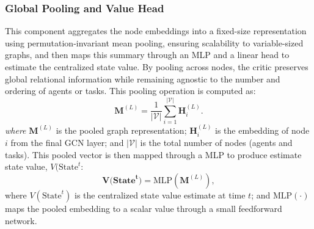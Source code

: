 \subsubsection{\textbf{Global Pooling and Value Head}} \label{critic_valuehead}
This component aggregates the node embeddings into a fixed-size representation using permutation-invariant mean pooling, ensuring scalability to variable-sized graphs, and then maps this summary through an MLP and a linear head to estimate the centralized state value. By pooling across nodes, the critic preserves global relational information while remaining agnostic to the number and ordering of agents or tasks. This pooling operation is computed as:
\begin{equation}
\mathbf{M}^{(L)} = \frac{1}{|\mathcal{V}|} \sum_{i=1}^{|\mathcal{V}|} \mathbf{H}^{(L)}_i.
\end{equation}
\noindent\textit{where} \(\mathbf{M}^{(L)}\) is the pooled graph representation;
\(\mathbf{H}^{(L)}_i\) is the embedding of node \(i\) from the final GCN layer;
and \(|\mathcal{V}|\) is the total number of nodes (agents and tasks). This pooled vector is then mapped through a MLP to produce estimate state value, $V(\text{State}^t$:
\begin{equation}
\mathbf{V(\text{State}^t}) = \text{MLP}(\mathbf{M}^{(L)}),
\end{equation}
\noindent where \(V(\text{State}^t)\) is the centralized state value estimate at time \(t\);
and \(\mathrm{MLP}(\cdot)\) maps the pooled embedding to a scalar value through a small feedforward network.

\fi





